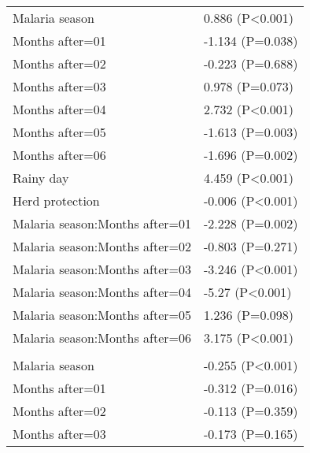 \documentclass[]{article}
\begin{document}
\begin{longtable}[t]{ll}
\hspace{1em}Malaria season & 0.886 (P<0.001)\\
\hspace{1em}Months after=01 & -1.134 (P=0.038)\\
\hspace{1em}Months after=02 & -0.223 (P=0.688)\\
\hspace{1em}Months after=03 & 0.978 (P=0.073)\\
\hspace{1em}Months after=04 & 2.732 (P<0.001)\\
\hspace{1em}Months after=05 & -1.613 (P=0.003)\\
\hspace{1em}Months after=06 & -1.696 (P=0.002)\\
\hspace{1em}Rainy day & 4.459 (P<0.001)\\
\hspace{1em}Herd protection & -0.006 (P<0.001)\\
\hspace{1em}Malaria season:Months after=01 & -2.228 (P=0.002)\\
\hspace{1em}Malaria season:Months after=02 & -0.803 (P=0.271)\\
\hspace{1em}Malaria season:Months after=03 & -3.246 (P<0.001)\\
\hspace{1em}Malaria season:Months after=04 & -5.27 (P<0.001)\\
\hspace{1em}Malaria season:Months after=05 & 1.236 (P=0.098)\\
\hspace{1em}Malaria season:Months after=06 & 3.175 (P<0.001)\\
\addlinespace[1.5em]
\multicolumn{2}{l}{\textbf{Temporary field worker}}\\
\hspace{1em}Malaria season & -0.255 (P<0.001)\\
\hspace{1em}Months after=01 & -0.312 (P=0.016)\\
\hspace{1em}Months after=02 & -0.113 (P=0.359)\\
\hspace{1em}Months after=03 & -0.173 (P=0.165)\\

\end{longtable}
\end{document}
